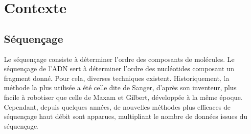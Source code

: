 \section{Contexte}

%
%
%
%

\subsection{Séquençage}
Le séquençage consiste à déterminer l'ordre des composants de molécules. Le séquençage de l'ADN sert à déterminer l'ordre des nucléotides composant un fragment donné. Pour cela, diverses techniques existent. Historiquement, la méthode la plus utilisée a été celle dite de Sanger, d'après son inventeur, plus facile à robotiser que celle de Maxam et Gilbert, développée à la même époque. Cependant, depuis quelques années, de nouvelles méthodes plus efficaces de séquençage haut débit sont apparues, multipliant le nombre de données issues du séquençage.

